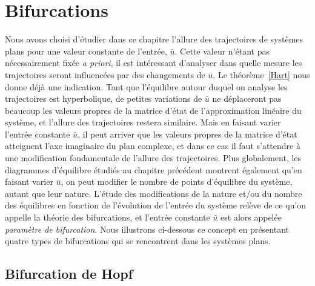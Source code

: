 
\section{Bifurcations}

Nous avons choisi d'{é}tudier dans ce chapitre l'allure des trajectoires de syst{è}mes plans pour une valeur constante de l'entr{é}e, $\bar u$. Cette valeur n'{é}tant pas
n{é}cessairement fix{é}e {\em a priori}, il est int{é}ressant d'analyser dans quelle
mesure les trajectoires seront influenc{é}es par des changements de $\bar u$. Le
th{é}or{è}me~\ref{Hart} nous donne d{é}j{à} une indication. Tant que l'{é}quilibre autour
duquel on analyse les trajectoires est hyperbolique, de petites variations de $\bar u$ ne
d{é}placeront pas beaucoup les valeurs propres de la matrice d'{é}tat de l'approximation
lin{é}aire du syst{è}me, et l'allure des trajectoires restera similaire. Mais en faisant
varier l'entr{é}e constante $\bar u$, il peut arriver que les
valeurs propres de la matrice d'{é}tat atteignent l'axe imaginaire du plan complexe, et
dans ce cas il faut s'attendre
{à} une modification fondamentale de l'allure des trajectoires. Plus globalement, les
diagrammes d'{é}quilibre {é}tudi{é}s au chapitre pr{é}c{é}dent montrent {é}galement qu'en
faisant varier $\bar u$, on peut modifier le nombre de points d'{é}quilibre du syst{è}me,
autant que leur nature. L'{é}tude des modifications de la nature et/ou du nombre des
{é}quilibres en fonction de l'{é}volution de l'entr{é}e du syst{è}me
rel{è}ve de ce qu'on appelle la th{é}orie des bifurcations, et l'entr{é}e constante $\bar u$ est alors
appel{é}e {\em param{è}tre de bifurcation}. Nous illustrons ci-dessous ce concept en
pr{é}sentant quatre types de bifurcations qui se rencontrent dans les syst{è}mes plans.

\subsection{Bifurcation de Hopf}

